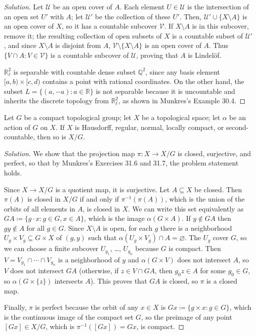 \documentclass[10pt]{article}
\providecommand{\QQ}{\mathbb Q}
\providecommand{\RR}{\mathbb R}
\providecommand{\inv}{^{-1}}
\newenvironment{soln}{\begin{proof}[Solution]}{\end{proof}}
\begin{document}
\begin{soln}
    Let $\mathcal U$ be an open cover of $A$.
    Each element $U\in \mathcal U$ is the intersection of an open set $U'$
    with $A$; let $\mathcal U'$ be the collection of these $U'$.
    Then, $\mathcal U' \cup \{X\setminus A\}$ is an open cover of $X$,
    so it has a countable subcover $\mathcal V$.
    If $X\setminus A$ is in this subcover, remove it;
    the resulting collection of open subsets of $X$
    is a countable subset of $\mathcal U'$, and since $X\setminus A$
    is disjoint from $A$, $\mathcal V\setminus\{X\setminus A\}$
    is an open cover of $A$. Thus $\{V\cap A : V\in\mathcal V\}$
    is a countable subcover of $\mathcal U$, proving that $A$ is Lindel\"of.

    $\RR_\ell^2$ is separable with countable dense subset $\QQ^2$,
    since any basis element $[a,b)\times[c,d)$ contains a point
    with rational coordinates. On the other hand, the subset
    $L = \{(a,-a) : a\in\RR\}$ is not separable because it is uncountable
    and inherits the discrete topology from $\RR_\ell^2$,
    as shown in Munkres's Example 30.4.
\end{soln}

\begin{problem}[Munkres 31.8]
    Let $G$ be a compact topological group;
    let $X$ be a topological space;
    let $\alpha$ be an action of $G$ on $X$.
    If $X$ is Hausdorff, regular, normal, locally compact, or second-countable,
    then so is $X/G$.
\end{problem}

\begin{soln}
    We show that the projection map $\pi\colon X\to X/G$
    is closed, surjective, and perfect, so that by Munkres's Exercises 31.6 and 31.7,
    the problem statement holds.

    Since $X\to X/G$ is a quotient map, it is surjective.
    Let $A\subseteq X$ be closed. Then $\pi(A)$ is closed in $X/G$
    if and only if $\pi\inv(\pi(A))$, which is the union of
    the orbits of all elements in $A$, is closed in $X$.
    We can write this set equivalently as $GA\coloneq\{g\cdot x : g\in G, x\in A\}$,
    which is the image $\alpha(G\times A)$.
    If $y\notin GA$ then $gy\notin A$ for all $g\in G$.
    Since $X\setminus A$ is open, for each $g$ there is a neighborhood
    $U_g\times V_g\subseteq G\times X$ of $(g,y)$ such that
    $\alpha(U_g\times V_g)\cap A = \varnothing$.
    The $U_g$ cover $G$, so we can choose a finite subcover
    $U_{g_1}$, \dots, $U_{g_n}$ because $G$ is compact.
    Then $V = V_{g_1}\cap\cdots\cap V_{g_n}$ is a neighborhood of $y$
    and $\alpha(G\times V)$ does not intersect $A$,
    so $V$ does not intersect $GA$ (otherwise, if $z\in V\cap GA$,
    then $g_0z \in A$ for some $g_0\in G$, so $\alpha(G\times\{z\})$ intersects $A$).
    This proves that $GA$ is closed, so $\pi$ is a closed map.

    Finally, $\pi$ is perfect because the orbit of any $x\in X$
    is $Gx\coloneq\{g\times x : g\in G\}$, which is the continuous image
    of the compact set $G$, so the preimage of any point $[Gx]\in X/G$,
    which is $\pi\inv([Gx]) = Gx$, is compact.
\end{soln}
\end{document}
